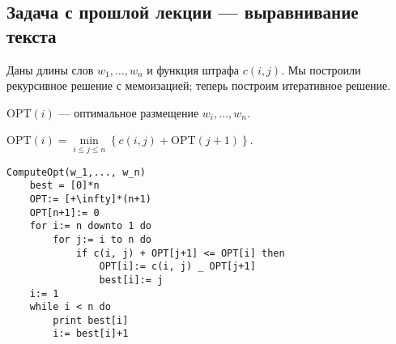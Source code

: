 \subsection{Задача с прошлой лекции --- выравнивание текста}

Даны длины слов $w_1,\ldots, w_n$ и функция штрафа $c(i, j)$. Мы построили рекурсивное решение с мемоизацией; теперь построим итеративное решение.

OPT$(i)$ --- оптимальное размещение $w_i, \ldots, w_n$.

$\mathrm{OPT}(i) = \min\limits_{i\leqslant j\leqslant n} \left\{ c(i, j)+ \mathrm{OPT}(j+1) \right\}$.

\begin{lstlisting}
ComputeOpt(w_1,..., w_n)
    best = [0]*n
    OPT:= [+\infty]*(n+1)
    OPT[n+1]:= 0
    for i:= n downto 1 do
        for j:= i to n do
            if c(i, j) + OPT[j+1] <= OPT[i] then
                OPT[i]:= c(i, j) _ OPT[j+1]
                best[i]:= j
    i:= 1
    while i < n do
        print best[i]
        i:= best[i]+1
\end{lstlisting}

